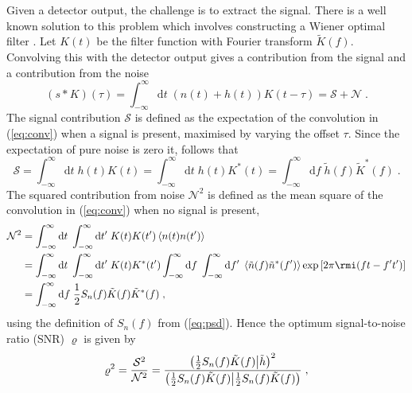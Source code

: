 Given a detector output, the challenge is to extract the signal. There is a well known solution to this problem which involves constructing a Wiener optimal filter . Let $K(t)$ be the filter function with Fourier transform $\tilde{K}(f)$. Convolving this with the detector output gives a contribution from the signal and a contribution from the noise
\begin{equation}\label{eq:conv}
\left(s*K\right)(\tau) = \int_{-\infty}^{\infty}\mathrm{d}t\;(n(t)+h(t))K(t-\tau) = \mathcal{S} + \mathcal{N} \; .
\end{equation}
The signal contribution $\mathcal{S}$ is defined as the expectation of the convolution in (\ref{eq:conv}) when a signal is present, maximised by varying the offset $\tau$.  Since the expectation of pure noise is zero it, follows that
\begin{equation}
\mathcal{S} = \int_{-\infty}^{\infty}\mathrm{d}t\;h(t)K(t)=\int_{-\infty}^{\infty}\mathrm{d}t\;h(t)K^{*}(t)=\int_{-\infty}^{\infty}\mathrm{d}f\; \tilde{h}(f)\tilde{K}^{*}(f) \; .
\end{equation}
The squared contribution from noise $\mathcal{N}^{2}$ is defined as the mean square of the convolution in (\ref{eq:conv}) when no signal is present,
\begin{eqnarray} 
\mathcal{N}^{2} &= \int_{-\infty}^{\infty}\mathrm{d}t\;\int_{-\infty}^{\infty}\mathrm{d}t'\;K(t)K(t')\left<n(t)n(t')\right> \nonumber \\
 &= \int_{-\infty}^{\infty}\mathrm{d}t\;\int_{-\infty}^{\infty}\mathrm{d}t'\;K(t)K^{*}(t')\int_{-\infty}^{\infty}\mathrm{d}f\;\int_{-\infty}^{\infty}\mathrm{d}f'\;\left<\tilde{n}(f)\tilde{n}^{*}(f')\right>\exp\left[2\pi\rmi(ft-f't')\right]\nonumber \\
 &= \int_{-\infty}^{\infty}\mathrm{d}f \; \frac{1}{2}S_{n}(f)\tilde{K}(f)\tilde{K}^{*}(f) \; ,
 \end{eqnarray}
using the definition of $S_{n}(f)$ from (\ref{eq:psd}). Hence the optimum signal-to-noise ratio (SNR) $\varrho$ is given by 
\begin{equation}\label{eq:SNRinnerprod} 
\varrho^{2} = \frac{\mathcal{S}^{2}}{\mathcal{N}^{2}}= \frac{\left({\frac{1}{2}S_{n}(f)\tilde{K}(f)}\middle|{\tilde{h}}\right)^{2}}{\left({\frac{1}{2}S_{n}(f)\tilde{K}(f)}\middle|{\frac{1}{2}S_{n}(f)\tilde{K}(f)}\right)} \;,
\end{equation}
